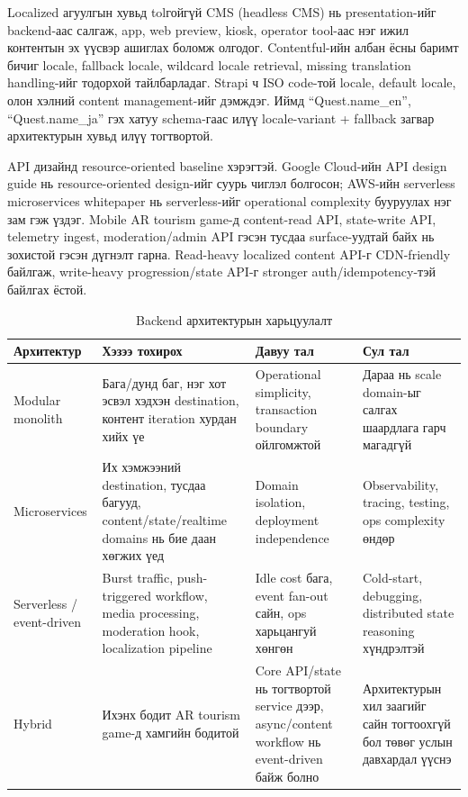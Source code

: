 \begin{sloppy}
Localized агуулгын хувьд tolгойгүй CMS (headless CMS) нь presentation-ийг backend-аас салгаж, app, web preview, kiosk, operator tool-аас нэг ижил контентын эх үүсвэр ашиглах боломж олгодог. Contentful-ийн албан ёсны баримт бичиг locale, fallback locale, wildcard locale retrieval, missing translation handling-ийг тодорхой тайлбарладаг. Strapi ч ISO code-той locale, default locale, олон хэлний content management-ийг дэмждэг. Иймд ``Quest.name\_en'', ``Quest.name\_ja'' гэх хатуу schema-гаас илүү locale-variant + fallback загвар архитектурын хувьд илүү тогтвортой.

API дизайнд resource-oriented baseline хэрэгтэй. Google Cloud-ийн API design guide нь resource-oriented design-ийг суурь чиглэл болгосон; AWS-ийн serverless microservices whitepaper нь serverless-ийг operational complexity бууруулах нэг зам гэж үздэг. Mobile AR tourism game-д content-read API, state-write API, telemetry ingest, moderation/admin API гэсэн тусдаа surface-уудтай байх нь зохистой гэсэн дүгнэлт гарна. Read-heavy localized content API-г CDN-friendly байлгаж, write-heavy progression/state API-г stronger auth/idempotency-тэй байлгах ёстой.

\begin{table}[H]
\centering
\caption{Backend архитектурын харьцуулалт}
\label{tab:backend-arch}
\small
\begin{tabular}{|p{3cm}|p{4cm}|p{3.5cm}|p{3.5cm}|}
\hline
\textbf{Архитектур} & \textbf{Хэзээ тохирох} & \textbf{Давуу тал} & \textbf{Сул тал} \\ \hline
Modular monolith & Бага/дунд баг, нэг хот эсвэл хэдхэн destination, контент iteration хурдан хийх үе & Operational simplicity, transaction boundary ойлгомжтой & Дараа нь scale domain-ыг салгах шаардлага гарч магадгүй \\ \hline
Microservices & Их хэмжээний destination, тусдаа багууд, content/state/realtime domains нь бие даан хөгжих үед & Domain isolation, deployment independence & Observability, tracing, testing, ops complexity өндөр \\ \hline
Serverless / event-driven & Burst traffic, push-triggered workflow, media processing, moderation hook, localization pipeline & Idle cost бага, event fan-out сайн, ops харьцангуй хөнгөн & Cold-start, debugging, distributed state reasoning хүндрэлтэй \\ \hline
Hybrid & Ихэнх бодит AR tourism game-д хамгийн бодитой & Core API/state нь тогтвортой service дээр, async/content workflow нь event-driven байж болно & Архитектурын хил заагийг сайн тогтоохгүй бол төвөг услын давхардал үүснэ \\ \hline
\end{tabular}
\end{table}


\end{sloppy}
